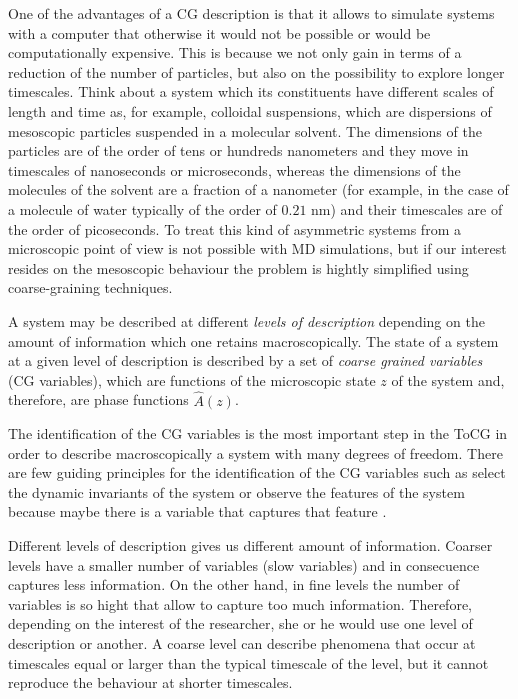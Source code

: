 \documentclass[b5paper,openright,10pt]{book}
\begin{document}
One of the advantages of a CG description is that it allows to simulate systems with a computer that otherwise it would not be possible or would be computationally expensive. 
This is because we not only gain in terms of a reduction of the number of particles, but also on the possibility to explore longer timescales. 
Think about a system which its constituents have different scales of length and time as, 
for example, colloidal suspensions, which are dispersions of mesoscopic particles suspended in a molecular solvent.
The dimensions of the particles are of the order of tens or hundreds nanometers and they move in timescales of nanoseconds or microseconds, whereas the dimensions of the molecules of the solvent are a fraction of a nanometer (for example, in the case of a molecule of water typically of the order of $0.21$ nm) and their timescales are of the order of picoseconds. To treat this kind of asymmetric systems from a microscopic point of view is not possible with MD simulations, but if our interest resides on the mesoscopic behaviour the problem is hightly simplified using coarse-graining techniques.    

A system may be described at different {\it levels of description} depending on the amount of information which one retains macroscopically. The state of a system at a given level of description is described by a set of {\it coarse grained variables} (CG variables), which are functions of the microscopic state $z$ of the system and, therefore, are phase functions $\hat{A}(z)$. 

The identification of the CG variables is the most important step in the ToCG in order to describe macroscopically a system with many degrees of freedom. There are few guiding principles for the identification of the CG variables such as select the dynamic invariants of the system or observe the features of the system because maybe there is a variable that captures that feature \cite{Karttunen2004}.

Different levels of description gives us different amount of information. Coarser levels have a smaller number of variables (slow variables) and in consecuence captures less information. On the other hand, in fine levels the number of variables is so hight that allow to capture too much information. 
Therefore, depending on the interest of the researcher, she or he would use one level of description or another. A coarse level can describe phenomena that occur at timescales equal or larger than the typical timescale of the level, but it cannot reproduce the behaviour at shorter timescales.
\end{document}
